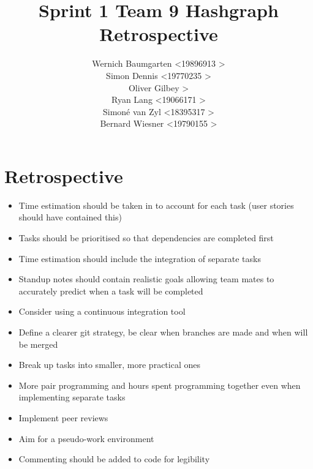 \documentclass[a4paper,10pt]{article}
\title{Sprint 1 Team 9 Hashgraph Retrospective}
\author{Wernich Baumgarten \textless 19896913 \textgreater \\
	Simon Dennis \textless 19770235 \textgreater  \\
	Oliver Gilbey \testless 17839688 \textgreater  \\
	Ryan Lang \textless 19066171 \textgreater  \\
	Simon\'e van Zyl \textless 18395317 \textgreater  \\
	Bernard Wiesner \textless 19790155 \textgreater}
\date{}
\begin{document}
\maketitle
\section{Retrospective}
\begin{itemize}
 \item Time estimation should be taken in to account for each task (user stories should have contained this)
 \item Tasks should be prioritised so that dependencies are completed first
 \item Time estimation should include the integration of separate tasks
 \item Standup notes should contain realistic goals allowing team mates to accurately predict when a 
 task will be completed
 \item Consider using a continuous integration tool
 \item Define a clearer git strategy, be clear when branches are made and when will be merged
 \item Break up tasks into smaller, more practical ones
 \item More pair programming and hours spent programming together even when implementing separate tasks
 \item Implement peer reviews
 \item Aim for a pseudo-work environment
 \item Commenting should be added to code for legibility
\end{itemize}
\end{document}
